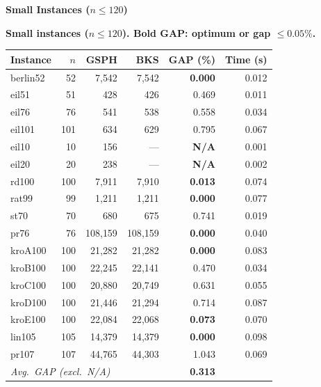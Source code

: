 \documentclass[runningheads]{llncs}
\begin{document}
\textbf{Small Instances ($n \le 120$)}

\begin{table}
\textbf{Small instances ($n\!\le\!120$).
\textbf{Bold GAP}: optimum or gap $\le\!0.05\%$.}\label{tab:small}
\centering\small
\begin{tabular}{@{}lrrrrr@{}}
\toprule
\textbf{Instance} & $n$ & \textbf{GSPH} & \textbf{BKS}
  & \textbf{GAP (\%)} & \textbf{Time (s)} \\
\midrule
berlin52   &  52 &   7{,}542 &   7{,}542 & \textbf{0.000} & 0.012 \\
eil51      &  51 &       428 &       426 &          0.469 & 0.011 \\
eil76      &  76 &       541 &       538 &          0.558 & 0.034 \\
eil101     & 101 &       634 &       629 &          0.795 & 0.067 \\
eil10      &  10 &       156 &       --- &  \textbf{N/A}  & 0.001 \\
eil20      &  20 &       238 &       --- &  \textbf{N/A}  & 0.002 \\
rd100      & 100 &   7{,}911 &   7{,}910 & \textbf{0.013} & 0.074 \\
rat99      &  99 &   1{,}211 &   1{,}211 & \textbf{0.000} & 0.077 \\
st70       &  70 &       680 &       675 &          0.741 & 0.019 \\
pr76       &  76 & 108{,}159 & 108{,}159 & \textbf{0.000} & 0.040 \\
kroA100    & 100 &  21{,}282 &  21{,}282 & \textbf{0.000} & 0.083 \\
kroB100    & 100 &  22{,}245 &  22{,}141 &          0.470 & 0.034 \\
kroC100    & 100 &  20{,}880 &  20{,}749 &          0.631 & 0.055 \\
kroD100    & 100 &  21{,}446 &  21{,}294 &          0.714 & 0.087 \\
kroE100    & 100 &  22{,}084 &  22{,}068 & \textbf{0.073} & 0.070 \\
lin105     & 105 &  14{,}379 &  14{,}379 & \textbf{0.000} & 0.098 \\
pr107      & 107 &  44{,}765 &  44{,}303 &          1.043 & 0.069 \\
\midrule
\multicolumn{4}{l}{\textit{Avg.\ GAP (excl.\ N/A)}}
  & \textbf{0.313} & \\
\bottomrule
\end{tabular}
\end{table}
\end{document}
